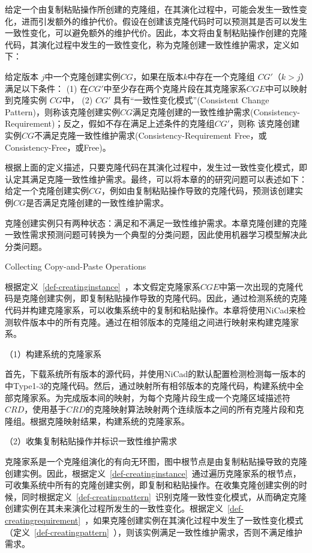 给定一个由复制粘贴操作所创建的克隆组，在其演化过程中，可能会发生一致性变化，进而引发额外的维护代价。假设在创建该克隆代码时可以预测其是否可以发生一致性变化，可以避免额外的维护代价。因此，本文将由复制粘贴操作创建的克隆代码，其演化过程中发生的一致性变化，称为克隆创建一致性维护需求，定义如下：

\begin{definition}[克隆创建一致性维护需求] 
 \label{def-creatingrequirement}
给定版本 $j$中一个克隆创建实例$CG$，如果在版本$k$中存在一个克隆组 $CG'$（$k>j$）满足以下条件： (1) 在$CG'$中至少存在两个克隆片段在其克隆家系$CGE$中可以映射到克隆实例 $CG$中， (2) $CG'$ 具有“一致性变化模式”(Consistent Change Pattern)，则称该克隆创建实例$CG$满足克隆创建的一致性维护需求(Consistency-Requirement)；反之，假如不存在满足上述条件的克隆组$CG'$，则称 该克隆创建实例$CG$不满足克隆一致性维护需求(Consistency-Requirement Free，或Consistency-Free，或Free)。
\end{definition}

根据上面的定义描述，只要克隆代码在其演化过程中，发生过一致性变化模式，即认定其满足克隆一致性维护需求。最终，可以将本章的的研究问题可以表述如下：给定一个克隆创建实例$CG$，例如由复制粘贴操作导致的克隆代码，预测该创建实例$CG$是否满足克隆创建的一致性维护需求。

克隆创建实例只有两种状态：满足和不满足一致性维护需求。本章克隆创建的克隆一致性需求预测问题可转换为一个典型的分类问题，因此使用机器学习模型解决此分类问题。

{Collecting Copy-and-Paste Operations}
\label{lab-checkcopied}

根据定义~\ref{def-creatinginstance}~，本文假定克隆家系$CGE$中第一次出现的克隆代码是克隆创建实例，即复制粘贴操作导致的克隆代码。因此，通过检测系统的克隆代码并构建克隆家系，可以收集系统中的复制和粘贴操作。本章将使用NiCad来检测软件版本中的所有克隆。通过在相邻版本的克隆组之间进行映射来构建克隆家系。

（1）构建系统的克隆家系

首先，下载系统所有版本的源代码，并使用NiCad的默认配置检测检测每一版本的中Type1-3的克隆代码。然后，通过映射所有相邻版本的克隆代码，构建系统中全部克隆家系。为完成版本间的映射，为每个克隆片段生成一个克隆区域描述符 $CRD$\cite{duala2010clone}，使用基于$CRD$的克隆映射算法映射两个连续版本之间的所有克隆片段和克隆组\cite{ci2013new,ci2013newD}。根据克隆映射结果，构建系统的克隆家系。

（2）收集复制粘贴操作并标识一致性维护需求

克隆家系是一个克隆组演化的有向无环图，图中根节点是由复制粘贴操导致的克隆创建实例。因此，根据定义~\ref{def-creatinginstance}~通过遍历克隆家系的根节点，可收集系统中所有的克隆创建实例，即复制和粘贴操作。在收集克隆创建实例的时候，同时根据定义~\ref{def-creatingpattern}~识别克隆一致性变化模式，从而确定克隆创建实例在其未来演化过程所发生的一致性变化。根据定义~\ref{def-creatingrequirement}~，如果克隆创建实例在其演化过程中发生了一致性变化模式（定义~\ref{def-creatingpattern}~），则该实例满足一致性维护需求，否则不满足维护需求。

